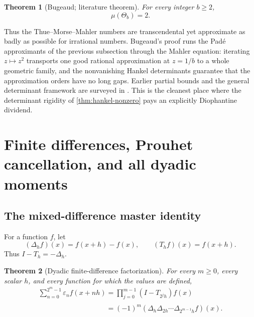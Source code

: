 \documentclass[11pt,oneside]{article}
\numberwithin{equation}{section}
\newtheorem{theorem}{Theorem}[section]
\theoremstyle{definition}
\theoremstyle{remark}
\newcommand{\eps}{\varepsilon}
\begin{document}
\begin{theorem}[Bugeaud; literature theorem]
\label{thm:irrationality-exponent}
For every integer \(b\ge2\),
\begin{equation}
  \boxed{\mu(\Theta_b)=2.}
  \label{eq:irrationality-exponent}
\end{equation}
\end{theorem}

Thus the Thue--Morse--Mahler numbers are transcendental yet approximate as
badly as possible for irrational numbers.  Bugeaud's proof
\cite{bugeaud2011} runs the Pad\'e approximants of the previous subsection
through the Mahler equation: iterating \(z\mapsto z^2\) transports one good
rational approximation at \(z=1/b\) to a whole geometric family, and the
nonvanishing Hankel determinants guarantee that the approximation orders
have no long gaps.  Earlier partial bounds and the general determinant
framework are surveyed in
\cite{bugeaudQueffelec2013,bugeaudHanWenYao2015}.  This is the cleanest
place where the determinant rigidity of \cref{thm:hankel-nonzero} pays an
explicitly Diophantine dividend.

\section[Finite differences and moments]{Finite differences, Prouhet cancellation, and all dyadic moments}
\label{sec:finite-differences}

\subsection{The mixed-difference master identity}

For a function \(f\), let
\begin{equation}
  (\Delta_hf)(x)=f(x+h)-f(x),
  \qquad
  (T_hf)(x)=f(x+h).
  \label{eq:difference-shift}
\end{equation}
Thus \(I-T_h=-\Delta_h\).

\begin{theorem}[Dyadic finite-difference factorization]
\label{thm:finite-difference-master}
For every \(m\ge0\), every scalar \(h\), and every function for which the
values are defined,
\begin{align}
  \boxed{
  \sum_{n=0}^{2^m-1}\eps_nf(x+nh)
  =\prod_{j=0}^{m-1}(I-T_{2^jh})f(x)}
  \label{eq:operator-product}\\
  \boxed{
  \phantom{\sum_{n=0}^{2^m-1}\eps_nf(x+nh)}
  =(-1)^m
    (\Delta_h\Delta_{2h}\cdots\Delta_{2^{m-1}h}f)(x).}
  \label{eq:mixed-difference}
\end{align}
\end{theorem}
\end{document}
